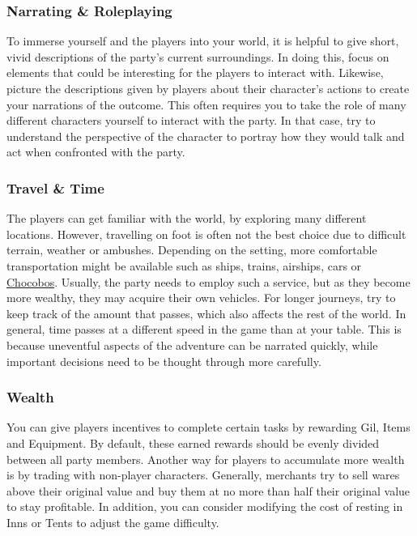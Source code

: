 \subsubsection*{Narrating \& Roleplaying}
To immerse yourself and the players into your world, it is helpful to give short, vivid descriptions of the party's current surroundings.
In doing this, focus on elements that could be interesting for the players to interact with.
Likewise, picture the descriptions given by players about their character's actions to create your narrations of the outcome.
This often requires you to take the role of many different characters yourself to interact with the party.
In that case, try to understand the perspective of the character to portray how they would talk and act when confronted with the party.

\vspace{1cm} 


\pagebreak

\subsubsection*{Travel \& Time}
The players can get familiar with the world, by exploring many different locations.
However, travelling on foot is often not the best choice due to difficult terrain, weather or ambushes.
Depending on the setting, more comfortable transportation might be available such as ships, trains, airships, cars or \hyperlink{chocobo}{Chocobos}.
Usually, the party needs to employ such a service, but as they become more wealthy, they may acquire their own vehicles.
For longer journeys, try to keep track of the amount that passes, which also affects the rest of the world.
In general, time passes at a different speed in the game than at your table.
This is because uneventful aspects of the adventure can be narrated quickly, while important decisions need to be thought through more carefully.

\subsubsection*{Wealth}
You can give players incentives to complete certain tasks by rewarding Gil, Items and Equipment.  
By default, these earned rewards should be evenly divided between all party members.
Another way for players to accumulate more wealth is by trading with non-player characters. 
Generally, merchants try to sell wares above their original value and buy them at no more than half their original value to stay profitable. 
In addition, you can consider modifying the cost of resting in Inns or Tents to adjust the game difficulty.

